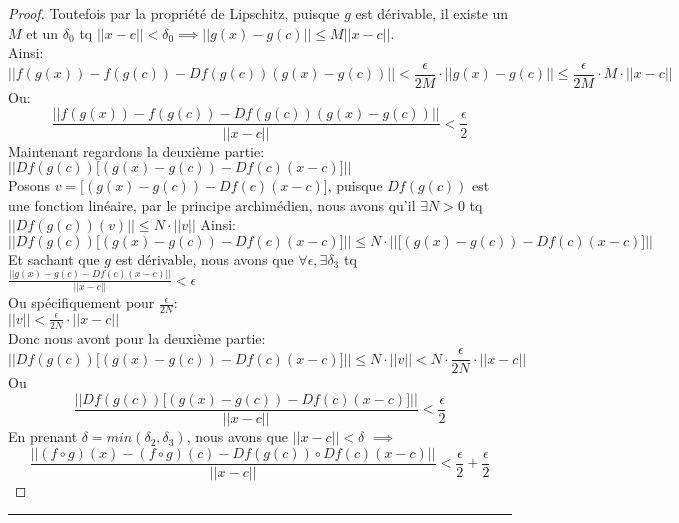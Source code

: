\documentclass[12pt]{report}
\theoremstyle{definition}
\newenvironment{preuve}{\renewcommand{\proofname}{Preuve}\begin{proof}}{\end{proof}\noindent\textcolor[RGB]{220,220,220}{\rule{\textwidth}{1pt}}}
\begin{document}
\begin{preuve}
        Toutefois par la propriété de Lipschitz, puisque $g$ est dérivable, il existe 
        un $M$ et un $\delta_0$ tq $||x - c|| < \delta_0 \implies ||g(x) - g(c)|| \leq M ||x - c||$.\\
        Ainsi:
        $$ ||f(g(x)) - f(g(c)) - Df(g(c)) (g(x) - g(c))|| < \frac{\epsilon}{2M} \cdot || g(x) - g(c) || \leq \frac{\epsilon}{2M} \cdot M \cdot || x - c||$$
        Ou:
        $$ \frac{||f(g(x)) - f(g(c)) - Df(g(c)) (g(x) - g(c))||}{||x - c||} < \frac{\epsilon}{2} $$
        Maintenant regardons la deuxième partie:\\
        $||Df(g(c))\big[(g(x) - g(c)) - Df(c)(x - c)\big]||$\\
        Posons $v = \big[(g(x) - g(c)) - Df(c)(x - c)\big]$, puisque $Df(g(c))$ est une fonction linéaire,
        par le principe archimédien, nous avons qu'il $\exists N>0$ tq $||Df(g(c))(v)|| \leq N \cdot ||v||$
        Ainsi:
        $$ ||Df(g(c))\big[(g(x) - g(c)) - Df(c)(x - c)\big]|| \leq N \cdot ||\big[(g(x) - g(c)) - Df(c)(x - c)\big]||$$
        Et sachant que $g$ est dérivable, nous avons que $\forall \epsilon, \exists \delta_3$ tq 
        $ \frac{||g(x) - g(c) - Df(c)(x - c)||}{||x - c||} < \epsilon$\\
        Ou spécifiquement pour $\frac{\epsilon}{2N}$:\\
        $ ||v|| < \frac{\epsilon}{2N} \cdot ||x - c||$\\
        Donc nous avont pour la deuxième partie:
        $$||Df(g(c))\big[(g(x) - g(c)) - Df(c)(x - c)\big]|| \leq N \cdot ||v|| < N \cdot \frac{\epsilon}{2N} \cdot ||x - c||$$
        Ou$$ \frac{||Df(g(c))\big[(g(x) - g(c)) - Df(c)(x - c)\big]||}{||x - c||} < \frac{\epsilon}{2} $$
        En prenant $\delta = min(\delta_2, \delta_3)$, nous 
        avons que $||x - c|| < \delta$ 
        $\implies$
        $$\frac{||(f \circ g)(x) - (f \circ g)(c) - Df(g(c)) \circ Df(c)(x - c)||}{|| x - c||} < \frac{\epsilon}{2} + \frac{\epsilon}{2}$$

    \end{preuve}

\end{document}
